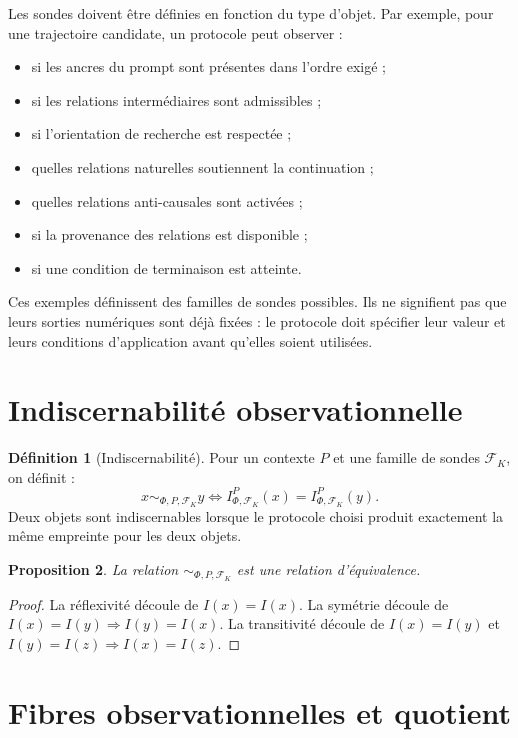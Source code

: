 \documentclass[11pt,a4paper]{report}
\theoremstyle{definition}
\newtheorem{definition}{Définition}[chapter]
\theoremstyle{plain}
\newtheorem{proposition}[definition]{Proposition}
\theoremstyle{remark}
\newcommand{\F}{\mathcal{F}}
\begin{document}
Les sondes doivent être définies en fonction du type d'objet.
Par exemple, pour une trajectoire candidate, un protocole peut
observer :
\begin{itemize}
  \item si les ancres du prompt sont présentes dans l'ordre exigé ;
  \item si les relations intermédiaires sont admissibles ;
  \item si l'orientation de recherche est respectée ;
  \item quelles relations naturelles soutiennent la continuation ;
  \item quelles relations anti-causales sont activées ;
  \item si la provenance des relations est disponible ;
  \item si une condition de terminaison est atteinte.
\end{itemize}

Ces exemples définissent des familles de sondes possibles. Ils
ne signifient pas que leurs sorties numériques sont déjà fixées :
le protocole doit spécifier leur valeur et leurs conditions
d'application avant qu'elles soient utilisées.

\section{Indiscernabilité observationnelle}

\begin{definition}[Indiscernabilité]
Pour un contexte \(P\) et une famille de sondes \(\F_K\), on
définit :
\[
x\sim_{\Phi,P,\F_K}y
\iff
I_{\Phi,\F_K}^{P}(x)
=
I_{\Phi,\F_K}^{P}(y).
\]
Deux objets sont indiscernables lorsque le protocole choisi
produit exactement la même empreinte pour les deux objets.
\end{definition}

\begin{proposition}
La relation \(\sim_{\Phi,P,\F_K}\) est une relation d'équivalence.
\end{proposition}

\begin{proof}
La réflexivité découle de
\(I(x)=I(x)\). La symétrie découle de
\(I(x)=I(y)\Rightarrow I(y)=I(x)\). La transitivité découle de
\(I(x)=I(y)\) et \(I(y)=I(z)\Rightarrow I(x)=I(z)\).
\end{proof}

\section{Fibres observationnelles et quotient}
\end{document}
